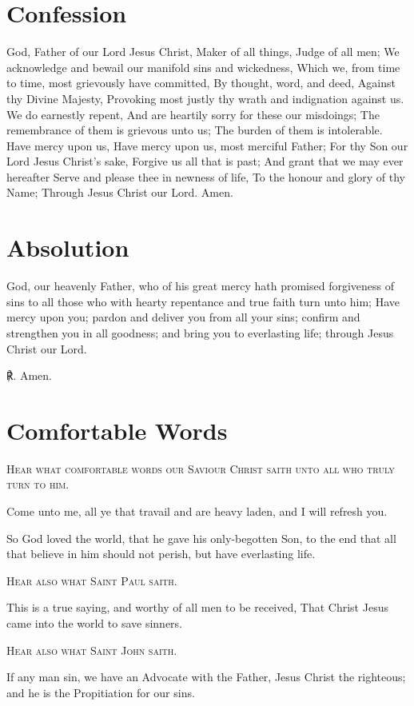 \section*{Confession}
 God, Father of our Lord Jesus Christ, Maker of all things, Judge of all men; We acknowledge and bewail our manifold sins and wickedness, Which we, from time to time, most grievously have committed, By thought, word, and deed, Against thy Divine Majesty, Provoking most justly thy wrath and indignation against us. We do earnestly repent, And are heartily sorry for these our misdoings; The remembrance of them is grievous unto us; The burden of them is intolerable. Have mercy upon us, Have mercy upon us, most merciful Father; For thy Son our Lord Jesus Christ's sake, Forgive us all that is past; And grant that we may ever hereafter Serve and please thee in newness of life, To the honour and glory of thy Name; Through Jesus Christ our Lord. Amen.

\section*{Absolution}
 God, our heavenly Father, who of his great mercy hath promised forgiveness of sins to all those who with hearty repentance and true faith turn unto him; Have mercy upon you; pardon {} and deliver you from all your sins; confirm and strengthen you in all goodness; and bring you to everlasting life; through Jesus Christ our Lord.

℟. Amen.
\clearpage
\section*{Comfortable Words}
\begin{center}
	\textsc{Hear what comfortable words our Saviour Christ saith unto all who truly turn to him.}
\end{center}
\par\noindent
Come unto me, all ye that travail and are heavy laden, and I will refresh you. 
\par\noindent
    So God loved the world, that he gave his only-begotten Son, to the end that all that believe in him should not perish, but have everlasting life. 
    \par\noindent
    \begin{center}
		\textsc{Hear also what Saint Paul saith.}
	\end{center}
\par\noindent
    This is a true saying, and worthy of all men to be received, That Christ Jesus came into the world to save sinners. 
\par\noindent
    \begin{center}
		\textsc{Hear also what Saint John saith.}
	\end{center}
    \par\noindent
    If any man sin, we have an Advocate with the Father, Jesus Christ the righteous; and he is the Propitiation for our sins. 

